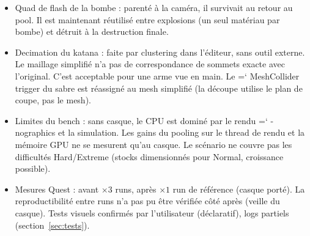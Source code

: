 \documentclass[11pt,a4paper]{article}
\renewcommand{\texttt}[1]{%
  {\ttfamily\hyphenchar\font=`\/ \hyphenpenalty=50 \exhyphenpenalty=50 #1}}
\begin{document}
\begin{itemize}
      le score de référence : 895 $\rightarrow$ 815.
\item Quad de flash de la bombe : parenté à la caméra, il survivait au retour au
      pool. Il est maintenant réutilisé entre explosions (un seul matériau par bombe)
      et détruit à la destruction finale.
\item Decimation du katana : faite par clustering dans l'éditeur, sans outil externe.
      Le maillage simplifié n'a pas de correspondance de sommets exacte avec
      l'original. C'est acceptable pour une arme vue en main. Le \texttt{MeshCollider}
      trigger du sabre est réassigné au mesh simplifié (la découpe utilise le plan de
      coupe, pas le mesh).
\item Limites du bench : sans casque, le CPU est dominé par le rendu
      \texttt{-nographics} et la simulation. Les gains du pooling sur le thread de
      rendu et la mémoire GPU ne se mesurent qu'au casque. Le scénario ne couvre pas
      les difficultés Hard/Extreme (stocks dimensionnés pour Normal, croissance
      possible).
\item Mesures Quest : avant $\times 3$ runs, après $\times 1$ run de référence (casque
      porté). La reproductibilité entre runs n'a pas pu être vérifiée côté après
      (veille du casque). Tests visuels confirmés par l'utilisateur (déclaratif),
      logs partiels (section~\ref{sec:tests}).
\end{itemize}
\end{document}

